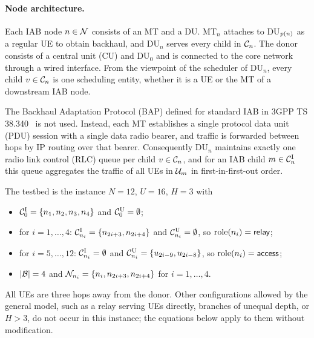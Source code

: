 \begin{EnChapter}
\paragraph{Node architecture.}
Each IAB node $n \in \mathcal{N}$ consists of an MT and a DU. MT$_n$ attaches to
DU$_{p(n)}$ as a regular UE to obtain backhaul, and DU$_n$ serves every child
in $\mathcal{C}_n$. The donor consists of a central unit (CU) and DU$_0$ and is connected
to the core network through a wired interface. From the viewpoint of the scheduler
of DU$_n$, every child $v \in \mathcal{C}_n$ is one scheduling entity, whether it is a UE
or the MT of a downstream IAB node.

\begin{assumption}
\label{ass:forwarding}
The Backhaul Adaptation Protocol (BAP) defined for standard IAB in 3GPP TS 38.340~\cite{3gpp38340} is
not used. Instead, each MT establishes a single protocol data unit (PDU) session
with a single data radio bearer, and traffic is forwarded between hops by IP
routing over that bearer. Consequently DU$_n$ maintains exactly one radio link
control (RLC) queue per child $v \in \mathcal{C}_n$, and for an IAB child
$m \in \mathcal{C}_n^{\mathrm{I}}$ this queue aggregates the traffic of all UEs in
$\mathcal{U}_m$ in first-in-first-out order.
\end{assumption}

\begin{example}
\label{ex:testbed}
The testbed is the instance $N=12$, $U=16$, $H=3$ with
\begin{itemize}
  \item $\mathcal{C}_0^{\mathrm{I}} = \{n_1, n_2, n_3, n_4\}$ and
        $\mathcal{C}_0^{\mathrm{U}} = \emptyset$;
  \item for $i=1,\dots,4$: $\mathcal{C}_{n_i}^{\mathrm{I}} = \{n_{2i+3}, n_{2i+4}\}$ and
        $\mathcal{C}_{n_i}^{\mathrm{U}} = \emptyset$, so $\operatorname{role}(n_i)=\textsf{relay}$;
  \item for $i=5,\dots,12$: $\mathcal{C}_{n_i}^{\mathrm{I}} = \emptyset$ and
        $\mathcal{C}_{n_i}^{\mathrm{U}} = \{u_{2i-9}, u_{2i-8}\}$, so
        $\operatorname{role}(n_i)=\textsf{access}$;
  \item $|\mathcal{B}| = 4$ and $\mathcal{N}_{n_i} = \{n_i, n_{2i+3}, n_{2i+4}\}$ for
        $i=1,\dots,4$.
\end{itemize}
All UEs are three hops away from the donor. Other configurations allowed by the
general model, such as a relay serving UEs directly, branches of unequal depth, or
$H>3$, do not occur in this instance; the equations below apply to them without
modification.
\end{example}


\end{EnChapter}
